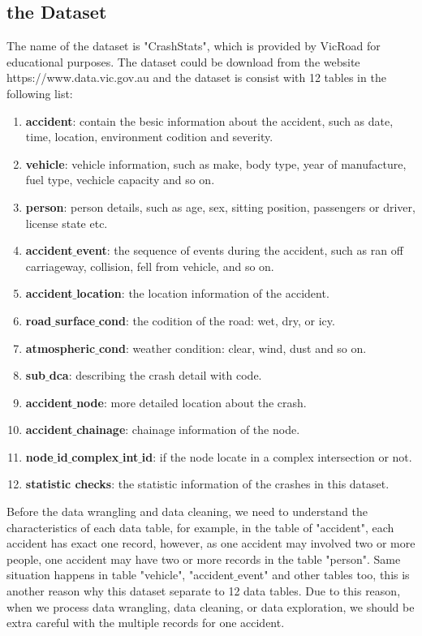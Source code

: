 \documentclass[11pt]{article}
\theoremstyle{definition}
\begin{document}
\subsection{the Dataset}
The name of the dataset is "CrashStats", which is provided by VicRoad for educational purposes. The dataset could be download from the website https://www.data.vic.gov.au and the dataset is consist with 12 tables in the following list:
\begin{enumerate}
	\item \textbf{accident}:	contain the besic information about the accident, such as date, time, location, environment codition and severity.
	\item \textbf{vehicle}:	vehicle information, such as make, body type, year of manufacture, fuel type, vechicle capacity and so on.
	\item \textbf{person}:	person details, such as age, sex, sitting position, passengers or driver, license state etc.	
	\item \textbf{accident$\_$event}: the sequence of events during the accident, such as ran off carriageway, collision, fell from vehicle, and so on.
	\item \textbf{accident$\_$location}:	the location information of the accident.
	\item \textbf{road$\_$surface$\_$cond}:	the codition of the road: wet, dry, or icy.
	\item \textbf{atmospheric$\_$cond}:	weather condition: clear, wind, dust and so on.
	\item \textbf{sub$\_$dca}:	describing the crash detail with code.
	\item \textbf{accident$\_$node}:	more detailed location about the crash.
	\item \textbf{accident$\_$chainage}:	chainage information of the node.
	\item \textbf{node$\_$id$\_$complex$\_$int$\_$id}:	if the node locate in a complex intersection or not.
	\item \textbf{statistic checks}:	the statistic information of the crashes in this dataset.
\end{enumerate}
Before the data wrangling and data cleaning, we need to understand the characteristics of each data table, for example, in the table of "accident", each accident has exact one record, however, as one accident may involved two or more people, one accident may have two or more records in the table "person". Same situation happens in table "vehicle", "accident$\_$event" and other tables too, this is another reason why this dataset separate to 12 data tables. Due to this reason, when we process data wrangling, data cleaning, or data exploration, we should be extra careful with the multiple records for one accident. 
	
\end{document}
